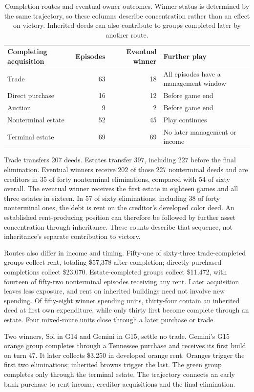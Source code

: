 \begin{table}[t]
\centering\small
\begin{tabularx}{\linewidth}{@{}lrrY@{}}
\toprule
Completing acquisition & Episodes & Eventual winner & Further play\\
\midrule
Trade & 63 & 18 & All episodes have a management window\\
Direct purchase & 16 & 12 & Before game end\\
Auction & 9 & 2 & Before game end\\
Nonterminal estate & 52 & 45 & Play continues\\
Terminal estate & 69 & 69 & No later management or income\\
\bottomrule
\end{tabularx}
\caption{Completion routes and eventual owner outcomes. Winner status is determined by the same trajectory, so these columns describe concentration rather than an effect on victory. Inherited deeds can also contribute to groups completed later by another route.}
\label{tab:routes}
\end{table}

Trade transfers 207 deeds. Estates transfer 397, including 227 before the final elimination. Eventual winners receive 202 of those 227 nonterminal deeds and are creditors in 35 of forty nonterminal eliminations, compared with 54 of sixty overall. The eventual winner receives the first estate in eighteen games and all three estates in sixteen. In 57 of sixty eliminations, including 38 of forty nonterminal ones, the debt is rent on the creditor's developed color deed. An established rent-producing position can therefore be followed by further asset concentration through inheritance. These counts describe that sequence, not inheritance's separate contribution to victory.

Routes also differ in income and timing. Fifty-one of sixty-three trade-completed groups collect rent, totaling \$57,378 after completion; directly purchased completions collect \$23,070. Estate-completed groups collect \$11,472, with fourteen of fifty-two nonterminal episodes receiving any rent. Later acquisition leaves less exposure, and rent on inherited buildings need not involve new spending. Of fifty-eight winner spending units, thirty-four contain an inherited deed at first own expenditure, while only thirty first become complete through an estate. Four mixed-route units close through a later purchase or trade.

Two winners, Sol in G14 and Gemini in G15, settle no trade. Gemini's G15 orange group completes through a Tennessee purchase and receives its first build on turn 47. It later collects \$3,250 in developed orange rent. Oranges trigger the first two eliminations; inherited browns trigger the last. The green group completes only through the terminal estate. The trajectory connects an early bank purchase to rent income, creditor acquisitions and the final elimination.

